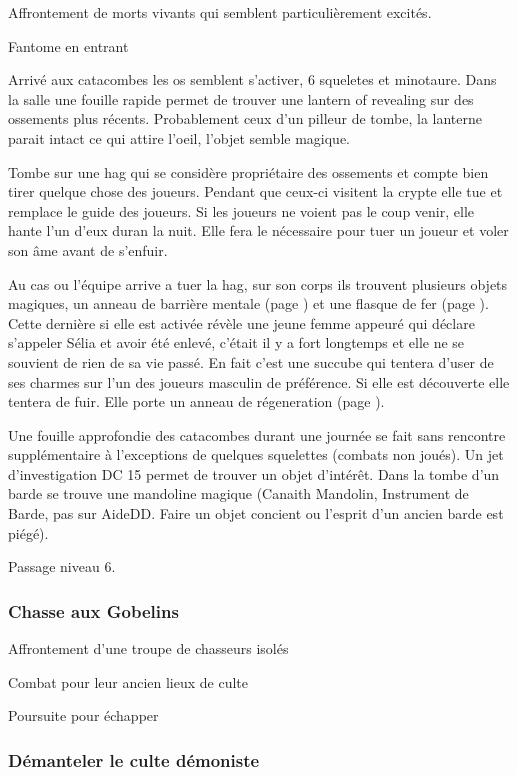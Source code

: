 Affrontement de morts vivants qui semblent particulièrement excités.

Fantome en entrant

Arrivé aux catacombes les os semblent s'activer, 6 squeletes et minotaure.
Dans la salle une fouille rapide permet de trouver une lantern of revealing 
sur des ossements plus récents. Probablement ceux d'un pilleur de tombe, la 
lanterne parait intact ce qui attire l'oeil, l'objet semble magique.

Tombe sur une hag qui se considère propriétaire des ossements et compte bien tirer quelque chose des joueurs.
Pendant que ceux-ci visitent la crypte elle tue et remplace le guide des joueurs. Si les joueurs ne voient pas le coup
venir, elle hante l'un d'eux duran la nuit. Elle fera le nécessaire pour tuer un joueur et voler son âme avant de s'enfuir.

Au cas ou l'équipe arrive a tuer la hag, sur son corps ils trouvent plusieurs objets magiques, un 
anneau de barrière mentale (page \pageref{AnneauBarriereMentale})
et une flasque de fer (page \pageref{FlasqueFer}). Cette dernière si elle est activée révèle une jeune femme appeuré qui déclare
s'appeler Sélia et avoir été enlevé, c'était il y a fort longtemps et elle ne se souvient de rien
de sa vie passé. En fait c'est une succube qui tentera d'user de ses charmes sur l'un des joueurs
masculin de préférence. Si elle est découverte elle tentera de fuir. Elle porte un anneau de 
régeneration (page \pageref{AnneauRegeneration}).

Une fouille approfondie des catacombes durant une journée se fait sans rencontre supplémentaire
à l'exceptions de quelques squelettes (combats non joués). Un jet d'investigation DC 15 permet
de trouver un objet d'intérêt. Dans la tombe d'un barde se trouve une mandoline magique
(Canaith Mandolin, Instrument de Barde, pas sur AideDD. Faire un objet concient ou l'esprit d'un
ancien barde est piégé).

Passage niveau 6.

\subsubsection*{Chasse aux Gobelins}

Affrontement d'une troupe de chasseurs isolés

Combat pour leur ancien lieux de culte 

Poursuite pour échapper

\subsubsection*{Démanteler le culte démoniste}


